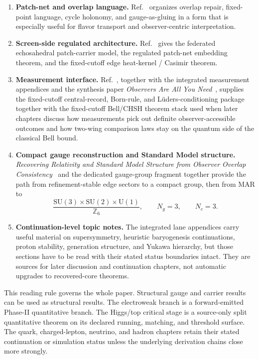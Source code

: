 \documentclass[11pt]{article}
\newcommand{\SU}{\mathrm{SU}}
\newcommand{\U}{\mathrm{U}}
\begin{document}
\begin{enumerate}[leftmargin=2em]
\item \textbf{Patch-net and overlap language.} Ref.~\cite{ophconsensus} organizes overlap repair,
fixed-point language, cycle holonomy, and gauge-as-gluing in a form that is especially useful
for flavor transport and observer-centric interpretation.
\item \textbf{Screen-side regulated architecture.} Ref.~\cite{ophmicrophysics} gives the
federated echosahedral patch-carrier model, the regulated patch-net embedding theorem, and the
fixed-cutoff edge heat-kernel / Casimir theorem.
\item \textbf{Measurement interface.} Ref.~\cite{ophmicrophysics}, together with the integrated
measurement appendices and the synthesis paper \emph{Observers Are All You Need}~\cite{ophsynthesis}, supplies the fixed-cutoff central-record, Born-rule, and
L\"uders-conditioning package together with the fixed-cutoff Bell/CHSH theorem stack used when
later chapters discuss how measurements pick out definite observer-accessible outcomes and how
two-wing comparison laws stay on the quantum side of the classical Bell bound.
\item \textbf{Compact gauge reconstruction and Standard Model structure.}
\emph{Recovering Relativity and Standard Model Structure from Observer Overlap Consistency}~\cite{ophcompact}
and the dedicated gauge-group fragment together provide the path from refinement-stable
edge sectors to a compact group, then from MAR to
\[
\frac{\SU(3)\times\SU(2)\times\U(1)}{\mathbb Z_6},
\qquad
N_g=3,
\qquad
N_c=3.
\]
\item \textbf{Continuation-level topic notes.} The integrated lane appendices carry useful material
on supersymmetry, heuristic baryogenesis continuations, proton stability, generation structure, and Yukawa hierarchy,
but those sections have to be read with their stated status boundaries intact. They are sources
for later discussion and continuation chapters, not automatic upgrades to recovered-core theorems.
\end{enumerate}

This reading rule governs the whole paper. Structural gauge and carrier results can be used
as structural results. The electroweak branch is a forward-emitted Phase-II
quantitative branch. The
Higgs/top critical stage is a source-only split quantitative theorem on its declared running, matching, and threshold surface. The quark,
charged-lepton, neutrino, and hadron chapters retain their stated continuation or
simulation status unless the underlying derivation chains close more strongly.
\end{document}
